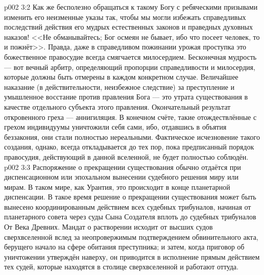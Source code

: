 \vs p002 3:2 \pc Как же бесполезно обращаться к такому Богу с ребяческими призывами изменить его неизменные указы так, чтобы мы могли избежать справедливых последствий действия его мудрых естественных законов и праведных духовных наказов! <<Не обманывайтесь; Бог осмеян не бывает, ибо что посеет человек, то и пожнёт>>. Правда, даже в справедливом пожинании урожая проступка это божественное правосудие всегда смягчается милосердием. Бесконечная мудрость --- вот вечный арбитр, определяющий пропорции справедливости и милосердия, которые должны быть отмерены в каждом конкретном случае. Величайшее наказание (в действительности, неизбежное следствие) за преступление и умышленное восстание против правления Бога --- это утрата существования в качестве отдельного субъекта этого правления. Окончательный результат откровенного греха --- аннигиляция. В конечном счёте, такие отождествлённые с грехом индивидуумы уничтожили себя сами, ибо, отдавшись в объятия беззакония, они стали полностью нереальными. Фактическое исчезновение такого создания, однако, всегда откладывается до тех пор, пока предписанный порядок правосудия, действующий в данной вселенной, не будет полностью соблюдён.
\vs p002 3:3 Распоряжение о прекращении существования обычно отдаётся при диспенсационном или эпохальном вынесении судебного решения миру или мирам. В таком мире, как Урантия, это происходит в конце планетарной диспенсации. В такое время решение о прекращении существования может быть вынесено координированным действием всех судебных трибуналов, начиная от планетарного совета через суды Сына Создателя вплоть до судебных трибуналов От Века Древних. Мандат о растворении исходит от высших судов сверхвселенной вслед за неопровержимым подтверждением обвинительного акта, берущего начало на сфере обитания преступника; и затем, когда приговор об уничтожении утверждён наверху, он приводится в исполнение прямым действием тех судей, которые находятся в столице сверхвселенной и работают оттуда.
